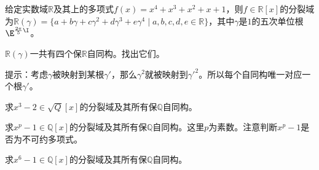 \begin{exercise}{}
给定实数域$\mathbb{R}$及其上的多项式$f(x)=x^4+x^3+x^2+x+1$，则$f\in\mathbb{R}[x]$的分裂域为$\mathbb{R}(\gamma)=\{a+b\gamma+c\gamma^2+d\gamma^3+e\gamma^4 \mid a, b, c, d, e\in\mathbb{R}\}$，其中$\gamma$是$1$的五次单位根$\E^{\frac{2\pi}{5}\I}$。

$\mathbb{R}(\gamma)$一共有四个保$\mathbb{R}$自同构。找出它们。

提示：考虑$\gamma$被映射到某根$\gamma'$，那么$\gamma^2$就被映射到$\gamma'^2$。所以每个自同构唯一对应一个根$\gamma'$。
\end{exercise}



\begin{exercise}{}\label{exe_SpltFd_1}
求$x^3-2\in\sqrt{Q}[x]$的分裂域及其所有保$\mathbb{Q}$自同构。
\end{exercise}



\begin{exercise}{}
求$x^p-1\in\mathbb{Q}[x]$的分裂域及其所有保$\mathbb{Q}$自同构。这里$p$为素数。注意判断$x^p-1$是否为不可约多项式。
\end{exercise}


\begin{exercise}{}
求$x^6-1\in\mathbb{Q}[x]$的分裂域及其所有保$\mathbb{Q}$自同构。
\end{exercise}















